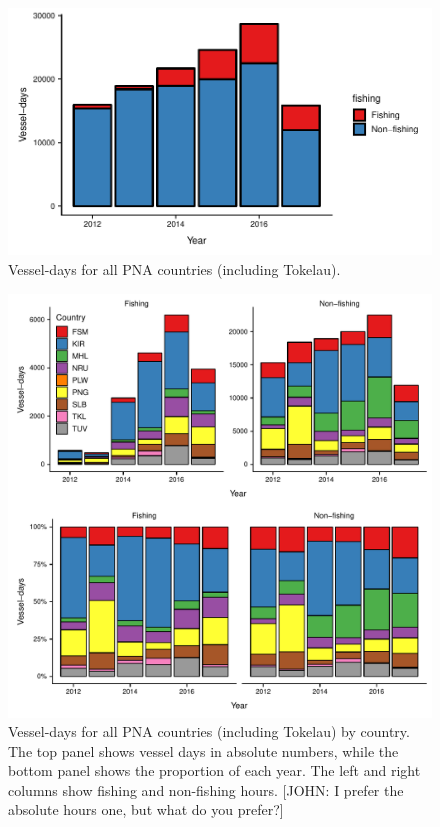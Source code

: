 \documentclass[9pttwoside,lineno]{pnas-new}
\begin{document}
\begin{figure}
\centering
\includegraphics{img/VDS_year.pdf}
\caption{\label{fig:VDS_year}Vessel-days for all PNA countries (including Tokelau).}
\end{figure}

\begin{figure}
\centering
\includegraphics{img/VDS_country_year.pdf}
\caption{\label{fig:VDS_country_year}Vessel-days for all PNA countries (including Tokelau) by country.
The top panel shows vessel days in absolute numbers, while the bottom panel shows the proportion
of each year. The left and right columns show fishing and non-fishing hours.
[JOHN: I prefer the absolute hours one, but what do you prefer?]}
\end{figure}
\end{document}
